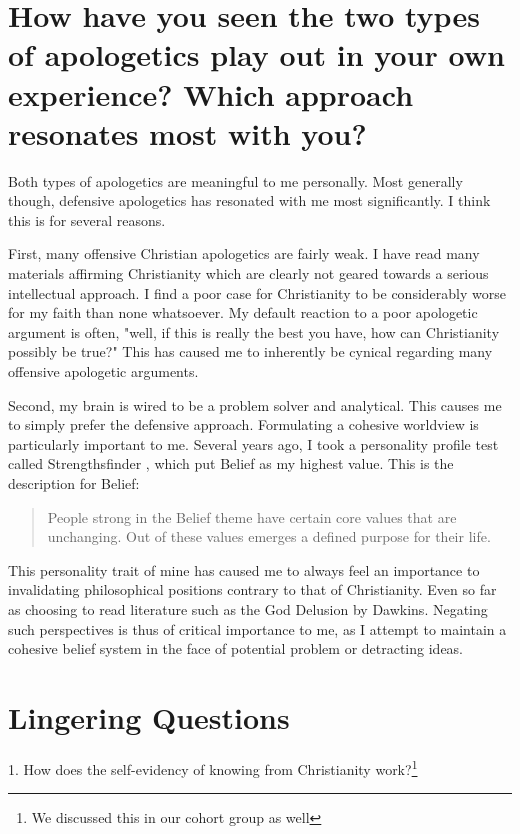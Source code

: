 \documentclass[12pt]{turabian-researchpaper}
\begin{document}
\section{How have you seen the two types of apologetics play out in your own experience? Which approach resonates most with you?}

Both types of apologetics are meaningful to me personally. Most generally though, defensive apologetics has resonated with me most significantly. I think this is for several reasons.

First, many offensive Christian apologetics are fairly weak. I have read many materials affirming Christianity which are clearly not geared towards a serious intellectual approach. I find a poor case for Christianity to be considerably worse for my faith than none whatsoever. My default reaction to a poor apologetic argument is often, "well, if this is really the best you have, how can Christianity possibly be true?" This has caused me to inherently be cynical regarding many offensive apologetic arguments.

Second, my brain is wired to be a problem solver and analytical. This causes me to simply prefer the defensive approach. Formulating a cohesive worldview is particularly important to me. Several years ago, I took a personality profile test called Strengthsfinder \autocite{rath2007strengthsfinder}, which put Belief as my highest value. This is the description for Belief:

\begin{quotation}
People strong in the Belief theme have certain core values that are unchanging. Out
of these values emerges a defined purpose for their life.
\end{quotation}

This personality trait of mine has caused me to always feel an importance to invalidating philosophical positions contrary to that of Christianity. Even so far as choosing to read literature such as the God Delusion by Dawkins. Negating such perspectives is thus of critical importance to me, as I attempt to maintain a cohesive belief system in the face of potential problem or detracting ideas.

\section{Lingering Questions}

1. How does the self-evidency of knowing from Christianity work?\footnote{We discussed this in our cohort group as well}
\end{document}
